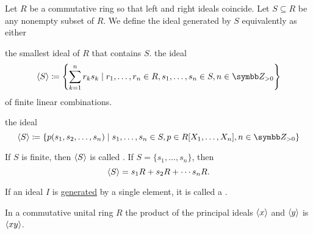 \begin{Definition}\label{def:generated_ring_ideal}
  Let \( R \) be a commutative ring so that left and right ideals coincide. Let \( S \subseteq R \) be any nonempty subset of \( R \). We define the ideal generated by \( S \) equivalently as either
  \begin{DefEnum}
     the smallest ideal of \( R \) that contains \( S \).
     the ideal
    \begin{equation*}
      \Gen S \coloneqq \left\{ \sum_{k=1}^n r_k s_k \mid r_1, \ldots, r_n \in R, s_1, \ldots, s_n \in S, n \in \BZ_{>0} \right\}
    \end{equation*}
    of finite linear combinations.

     the ideal
    \begin{equation*}
      \Gen S \coloneqq \left\{ p(s_1, s_2, \ldots, s_n) \mid s_1, \ldots, s_n \in S, p \in R[X_1, \ldots, X_n], n \in \BZ_{>0} \right\}
    \end{equation*}
  \end{DefEnum}

  If \( S \) is finite, then \( \left\langle S \right\rangle \) is called . If \( S = \{ s_1, \ldots, s_n \} \), then
  \begin{equation*}
    \left\langle S \right\rangle = s_1 R + s_2 R + \cdots s_n R.
  \end{equation*}
\end{Definition}

\begin{Definition}\label{def:principal_ideal}
  If an ideal \( I \) is \hyperref[def:generated_ring_ideal]{generated} by a single element, it is called a .
\end{Definition}

\begin{Proposition}\label{thm:product_of_principal_ideals}
  In a commutative unital ring \( R \) the product of the principal ideals \( \left\langle x \right\rangle \) and \( \left\langle y \right\rangle \) is \( \left\langle xy \right\rangle \).
\end{Proposition}
